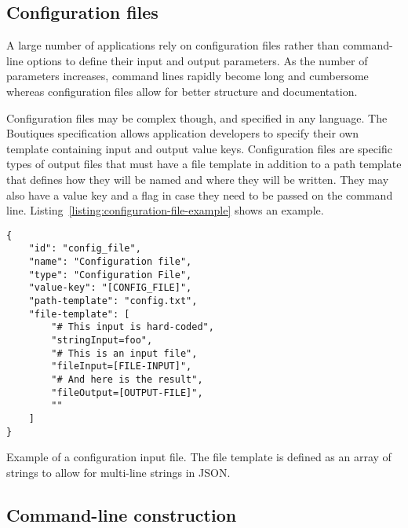 \documentclass[a4paper,num-refs]{oup-contemporary}
\newcommand{\boutiques}{Boutiques\xspace}
\begin{document}
\subsection{Configuration files}
\label{sec:configuration-files}
A large number of applications rely on configuration files rather than
command-line options to define their input and output parameters. As
the number of parameters increases, command lines rapidly become long
and cumbersome whereas configuration files allow for better structure
and documentation.

Configuration files may be complex though, and specified in any
language.  The \boutiques specification allows application developers
to specify their own template containing input and output value
keys. Configuration files are specific types of output files that must
have a file template in addition to a path template that defines how
they will be named and where they will be written. They may also have
a value key and a flag in case they need to be passed on the command
line. Listing~\ref{listing:configuration-file-example} shows an
example.
\begin{listing}
\begin{verbatim}
{
    "id": "config_file",
    "name": "Configuration file",
    "type": "Configuration File",
    "value-key": "[CONFIG_FILE]",
    "path-template": "config.txt",
    "file-template": [
        "# This input is hard-coded",
        "stringInput=foo",
        "# This is an input file",
        "fileInput=[FILE-INPUT]",
        "# And here is the result",
        "fileOutput=[OUTPUT-FILE]",
        ""
    ]
}
\end{verbatim}
\caption{Example of a configuration input file. The file template is defined as
  an array of strings to allow for multi-line strings in JSON.}
\label{listing:configuration-file-example}
\end{listing}

\subsection{Command-line construction}
\end{document}
